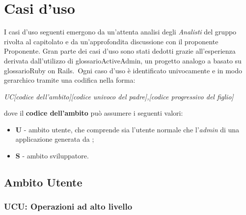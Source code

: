 \section{Casi d'uso}
I casi d'uso seguenti emergono da un'attenta analisi degli \textit{Analisti} del gruppo \GroupName{} rivolta al capitolato e da un'approfondita discussione con il proponente Proponente{}. Gran parte dei casi d'uso sono stati dedotti grazie all'esperienza derivata dall'utilizzo di glossario{ActiveAdmin}, un progetto analogo a \ProjectName{} basato su glossario{Ruby on Rails}.\
Ogni caso d'uso è identificato univocamente e in modo gerarchico tramite una codifica nella forma:
\begin{center}
	\textit{UC[codice dell'ambito][codice univoco del padre],[codice progressivo del figlio]}
\end{center} 
dove il \textbf{codice dell'ambito} può assumere i seguenti valori:

\begin{itemize}
	\item \textbf{U} - ambito utente, che comprende sia l'utente normale che l'\textit{admin} di una applicazione generata da \ProjectName{};
	\item \textbf{S} - ambito sviluppatore.
\end{itemize}


\subsection{Ambito Utente}
	\subsubsection{UCU: Operazioni ad alto livello}
		
